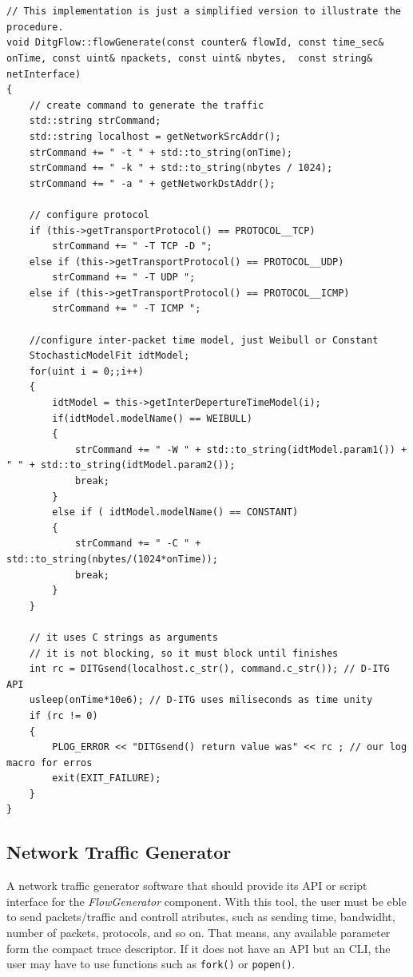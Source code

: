 \begin{verbatim}


// This implementation is just a simplified version to illustrate the procedure.
void DitgFlow::flowGenerate(const counter& flowId, const time_sec& onTime, const uint& npackets, const uint& nbytes,  const string& netInterface)
{
	// create command to generate the traffic
	std::string strCommand;
	std::string localhost = getNetworkSrcAddr(); 
	strCommand += " -t " + std::to_string(onTime); 
	strCommand += " -k " + std::to_string(nbytes / 1024);
	strCommand += " -a " + getNetworkDstAddr();
	
	// configure protocol
	if (this->getTransportProtocol() == PROTOCOL__TCP)
		strCommand += " -T TCP -D ";
	else if (this->getTransportProtocol() == PROTOCOL__UDP)
		strCommand += " -T UDP ";
	else if (this->getTransportProtocol() == PROTOCOL__ICMP)
		strCommand += " -T ICMP ";
		
	//configure inter-packet time model, just Weibull or Constant
	StochasticModelFit idtModel;
	for(uint i = 0;;i++)
	{	
		idtModel = this->getInterDepertureTimeModel(i);
		if(idtModel.modelName() == WEIBULL)
		{
			strCommand += " -W " + std::to_string(idtModel.param1()) + " " + std::to_string(idtModel.param2());
			break;
		}
		else if ( idtModel.modelName() == CONSTANT)
		{
			strCommand += " -C " + std::to_string(nbytes/(1024*onTime));
			break;
		}
	}
	
	// it uses C strings as arguments
	// it is not blocking, so it must block until finishes
	int rc = DITGsend(localhost.c_str(), command.c_str()); // D-ITG API
    usleep(onTime*10e6); // D-ITG uses miliseconds as time unity
	if (rc != 0)
	{
		PLOG_ERROR << "DITGsend() return value was" << rc ; // our log macro for erros
		exit(EXIT_FAILURE);
	}
}
\end{verbatim}

\subsection{Network Traffic Generator}


A network traffic generator software that should provide its API or script interface for the \textit{FlowGenerator} component. With this tool, the user must be eble to send packets/traffic and controll atributes, such as sending time, bandwidht, number of packets, protocols, and so on. That means, any available parameter form the compact trace descriptor. If it does not have an API but an CLI, the user may have to use functions such as \texttt{fork()} or \texttt{popen()}.
 






